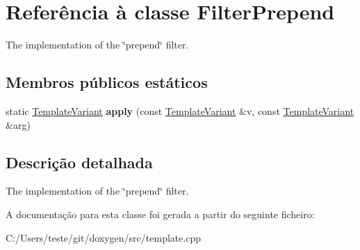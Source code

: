 \hypertarget{class_filter_prepend}{\section{Referência à classe Filter\-Prepend}
\label{class_filter_prepend}
}


The implementation of the \char`\"{}prepend\char`\"{} filter.  


\subsection*{Membros públicos estáticos}
\begin{DoxyCompactItemize}
\item 
\hypertarget{class_filter_prepend_a3987885c759841073f6ba1225c0cd2b8}{static \hyperlink{class_template_variant}{Template\-Variant} {\bfseries apply} (const \hyperlink{class_template_variant}{Template\-Variant} \&v, const \hyperlink{class_template_variant}{Template\-Variant} \&arg)}\label{class_filter_prepend_a3987885c759841073f6ba1225c0cd2b8}

\end{DoxyCompactItemize}


\subsection{Descrição detalhada}
The implementation of the \char`\"{}prepend\char`\"{} filter. 

A documentação para esta classe foi gerada a partir do seguinte ficheiro\-:\begin{DoxyCompactItemize}
\item 
C\-:/\-Users/teste/git/doxygen/src/template.\-cpp\end{DoxyCompactItemize}
